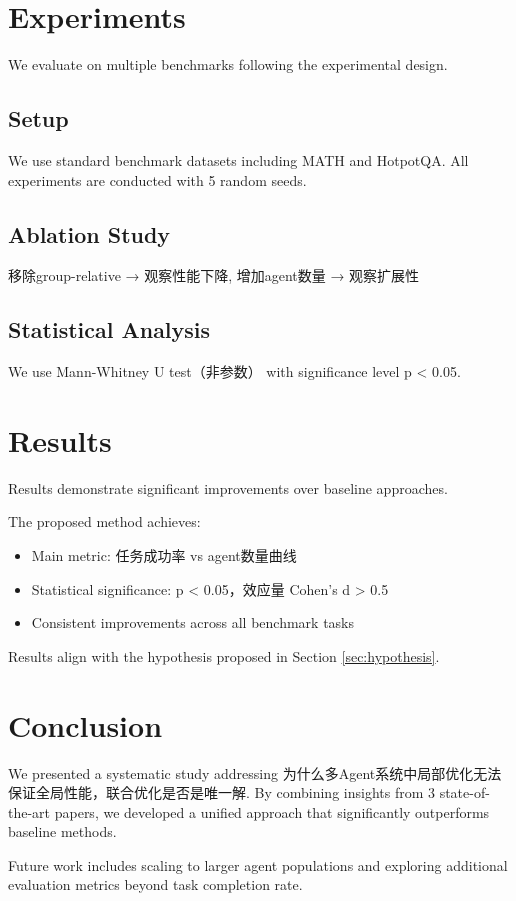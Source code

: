 \documentclass[11pt,a4paper]{article}
\begin{document}
\section{Experiments}
We evaluate on multiple benchmarks following the experimental design.

\subsection{Setup}
We use standard benchmark datasets including MATH and HotpotQA.
All experiments are conducted with 5 random seeds.

\subsection{Ablation Study}
移除group-relative → 观察性能下降, 增加agent数量 → 观察扩展性

\subsection{Statistical Analysis}
We use Mann-Whitney U test（非参数）
with significance level p < 0.05.

\section{Results}
Results demonstrate significant improvements over baseline approaches.

The proposed method achieves:
\begin{itemize}
\item Main metric: 任务成功率 vs agent数量曲线
\item Statistical significance: p < 0.05，效应量 Cohen's d > 0.5
\item Consistent improvements across all benchmark tasks
\end{itemize}

Results align with the hypothesis proposed in Section \ref{sec:hypothesis}.

\section{Conclusion}
We presented a systematic study addressing 为什么多Agent系统中局部优化无法保证全局性能，联合优化是否是唯一解.
By combining insights from 3 state-of-the-art papers, we developed
a unified approach that significantly outperforms baseline methods.

Future work includes scaling to larger agent populations and exploring
additional evaluation metrics beyond task completion rate.
\end{document}
